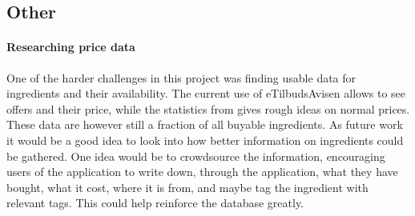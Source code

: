 \subsection{Other}

\paragraph{Researching price data}
One of the harder challenges in this project was finding usable data for ingredients and their availability. The current use of eTilbudsAvisen allows to see offers and their price, while the statistics from  gives rough ideas on normal prices.
These data are however still a fraction of all buyable ingredients. As future work it would be a good idea to look into how better information on ingredients could be gathered.
One idea would be to crowdsource the information, encouraging users of the application to write down, through the application, what they have bought, what it cost, where it is from, and maybe tag the ingredient with relevant tags. This could help reinforce the database greatly.